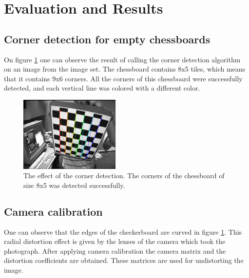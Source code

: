 \documentclass[conference]{IEEEtran}
\begin{document}
\section{Evaluation and Results}

\subsection{Corner detection for empty chessboards}

On figure \ref{fig:corner-detection} one can observe the result of calling the corner detection algorithm on an image from the image set. The chessboard contains 8x5 tiles, which means that it contains 9x6 corners. All the corners of this chessboard were successfully detected, and each vertical line was colored with a different color.

\begin{figure}[bt]
    \centering
    \includegraphics[width=5cm]{Figures/corner-detection.png}
    \caption{The effect of the corner detection. The corners of the chessboard of size 8x5 was detected successfully.}
    \label{fig:corner-detection}
\end{figure}


\subsection{Camera calibration}

One can observe that the edges of the checkerboard are curved in figure \ref{fig:corner-detection}. This radial distortion effect is given by the lenses of the camera which took the photograph. After applying camera calibration the camera matrix and the distortion coefficients are obtained. These matrices are used for undistorting the image. 
\end{document}
